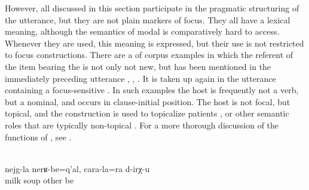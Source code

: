However, all  discussed in this section participate in the pragmatic structuring of the utterance, but they are not plain markers of focus. They all have a lexical meaning, although the semantics of modal  is comparatively hard to access. Whenever they are used, this meaning is expressed, but their use is not restricted to focus constructions. There are a  of corpus examples in which the referent of the item bearing the  is not only not new, but has been mentioned in the immediately preceding utterance , , . It is taken up again in the utterance containing a focus-sensitive . In such examples the host is frequently not a verb, but a nominal, and occurs in clause-initial position. The host is not focal, but topical, and the construction is used to topicalize patients ,  or other semantic roles that are typically non-topical . For a more thorough discussion of the functions of , see \citet{ForkerSubmittedc}.
%
\begin{exe}
	\\\label{ex:There is milk soup and soup from other things@21}%
	\gll	nejg-la	nerʁ-be=q'al,	cara-la=ra	d-irχ-u\\
		milk	soup	other	be\\
	\glt	{}
\end{exe}
